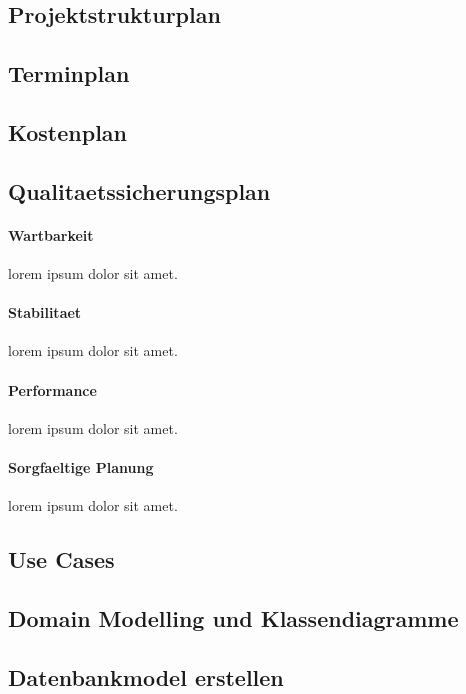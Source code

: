 \subsection{Projektstrukturplan}
   \blindtext
\subsection{Terminplan}
   \blindtext
\subsection{Kostenplan}
  \blindtext
\subsection{Qualitaetssicherungsplan}
  \blindtext
  \paragraph{Wartbarkeit}
  lorem ipsum dolor sit amet.
  \paragraph{Stabilitaet}
  lorem ipsum dolor sit amet.
  \paragraph{Performance}
  lorem ipsum dolor sit amet.
  \paragraph{Sorgfaeltige Planung}
  lorem ipsum dolor sit amet.
\subsection{Use Cases}
  \blindtext
\subsection{Domain Modelling und Klassendiagramme}
  \blindtext
\subsection{Datenbankmodel erstellen}
  \blindtext
